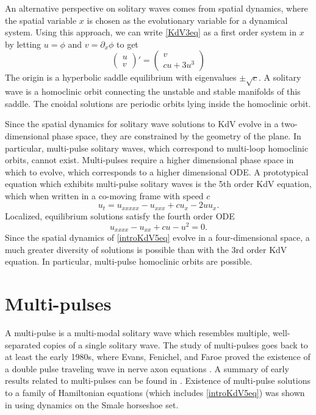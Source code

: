 \documentclass[thesis.tex]{subfiles}
\begin{document}
An alternative perspective on solitary waves comes from spatial dynamics, where the spatial variable $x$ is chosen as the evolutionary variable for a dynamical system. Using this approach, we can write \cref{KdV3eq} as a first order system in $x$ by letting $u = \phi$ and $v = \partial_x \phi$ to get
\begin{equation}\label{KdV3sd}
\begin{pmatrix}u \\ v
\end{pmatrix}'
= \begin{pmatrix}
v \\ c u + 3 u^3
\end{pmatrix}
\end{equation}
The origin is a hyperbolic saddle equilibrium with eigenvalues $\pm \sqrt{c}$. A solitary wave is a homoclinic orbit connecting the unstable and stable manifolds of this saddle. The cnoidal solutions are periodic orbits lying inside the homoclinic orbit.

Since the spatial dynamics for solitary wave solutions to KdV evolve in a two-dimensional phase space, they are constrained by the geometry of the plane. In particular, multi-pulse solitary waves, which correspond to multi-loop homoclinic orbits, cannot exist. Multi-pulses require a higher dimensional phase space in which to evolve, which corresponds to a higher dimensional ODE. A prototypical equation which exhibits multi-pulse solitary waves is the 5th order KdV equation, which when written in a co-moving frame with speed $c$ 
\begin{equation}\label{introKdV5}
u_t = u_{xxxxx} - u_{xxx} + c u_x - 2 u u_x .
\end{equation}
Localized, equilibrium solutions satisfy the fourth order ODE
\begin{equation}\label{introKdV5eq}
u_{xxxx} - u_{xx} + c u - u^2 = 0.
\end{equation}
Since the spatial dynamics of \cref{introKdV5eq} evolve in a four-dimensional space, a much greater diversity of solutions is possible than with the 3rd order KdV equation. In particular, multi-pulse homoclinic orbits are possible.

\section{Multi-pulses}

A multi-pulse is a multi-modal solitary wave which resembles multiple, well-separated copies of a single solitary wave. The study of multi-pulses goes back to at least the early 1980s, where Evans, Fenichel, and Faroe proved the existence of a double pulse traveling wave in nerve axon equations \cite{Evans1982}. A summary of early results related to multi-pulses can be found in \cite[Section 1]{Sandstede1998}. Existence of multi-pulse solutions to a family of Hamiltonian equations (which includes \cref{introKdV5eq}) was shown in \cite{Buffoni1996} using dynamics on the Smale horseshoe set. 
\end{document}
